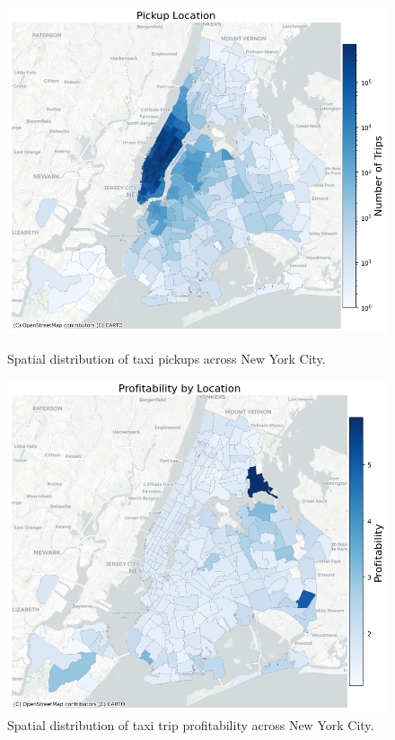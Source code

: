 \documentclass[11pt]{article}
\begin{document}
\begin{figure}[h]
    \centering
    \begin{minipage}{0.48\textwidth}
        \centering
        \includegraphics[width=\textwidth]{plots/pickup_frequency_map.png}
        \caption{Spatial distribution of taxi pickups across New York City.}
        \label{fig:pickup_location}
    \end{minipage}\hfill
    \begin{minipage}{0.48\textwidth}
        \centering
        \includegraphics[width=\textwidth]{plots/profbylocation.png}
        \caption{Spatial distribution of taxi trip profitability across New York City.}
        \label{fig:prof_by_location}
    \end{minipage}
\end{figure}
\end{document}
